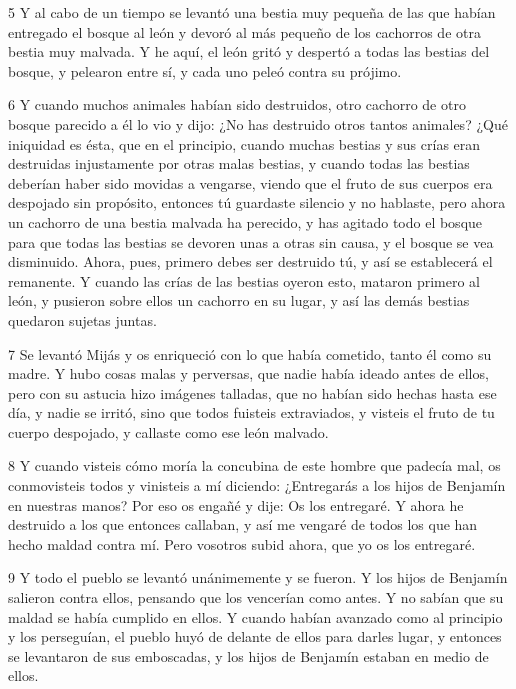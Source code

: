 \par 5 Y al cabo de un tiempo se levantó una bestia muy pequeña de las que habían entregado el bosque al león y devoró al más pequeño de los cachorros de otra bestia muy malvada. Y he aquí, el león gritó y despertó a todas las bestias del bosque, y pelearon entre sí, y cada uno peleó contra su prójimo.

\par 6 Y cuando muchos animales habían sido destruidos, otro cachorro de otro bosque parecido a él lo vio y dijo: ¿No has destruido otros tantos animales? ¿Qué iniquidad es ésta, que en el principio, cuando muchas bestias y sus crías eran destruidas injustamente por otras malas bestias, y cuando todas las bestias deberían haber sido movidas a vengarse, viendo que el fruto de sus cuerpos era despojado sin propósito, entonces tú guardaste silencio y no hablaste, pero ahora un cachorro de una bestia malvada ha perecido, y has agitado todo el bosque para que todas las bestias se devoren unas a otras sin causa, y el bosque se vea disminuido. Ahora, pues, primero debes ser destruido tú, y así se establecerá el remanente. Y cuando las crías de las bestias oyeron esto, mataron primero al león, y pusieron sobre ellos un cachorro en su lugar, y así las demás bestias quedaron sujetas juntas.

\par 7 Se levantó Mijás y os enriqueció con lo que había cometido, tanto él como su madre. Y hubo cosas malas y perversas, que nadie había ideado antes de ellos, pero con su astucia hizo imágenes talladas, que no habían sido hechas hasta ese día, y nadie se irritó, sino que todos fuisteis extraviados, y visteis el fruto de tu cuerpo despojado, y callaste como ese león malvado.

\par 8 Y cuando visteis cómo moría la concubina de este hombre que padecía mal, os conmovisteis todos y vinisteis a mí diciendo: ¿Entregarás a los hijos de Benjamín en nuestras manos? Por eso os engañé y dije: Os los entregaré. Y ahora he destruido a los que entonces callaban, y así me vengaré de todos los que han hecho maldad contra mí. Pero vosotros subid ahora, que yo os los entregaré.

\par 9 Y todo el pueblo se levantó unánimemente y se fueron. Y los hijos de Benjamín salieron contra ellos, pensando que los vencerían como antes. Y no sabían que su maldad se había cumplido en ellos. Y cuando habían avanzado como al principio y los perseguían, el pueblo huyó de delante de ellos para darles lugar, y entonces se levantaron de sus emboscadas, y los hijos de Benjamín estaban en medio de ellos.

